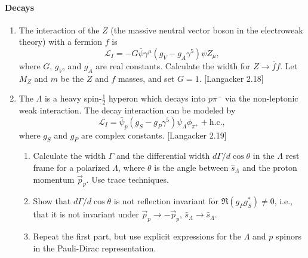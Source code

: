 \documentclass[letterpaper,11pt]{article}
\begin{document}
\paragraph*{Decays}
\begin{enumerate}
  \item The interaction of the $Z$ (the massive neutral vector boson in the electroweak theory) with a fermion $f$ is
  \begin{equation*}
    \mathcal{L}_I = -G \bar{\psi} \gamma^\mu (g_V - g_A \gamma^5) \psi Z_\mu,
  \end{equation*}
  where $G$, $g_V$, and $g_A$ are real constants. Calculate the width for $Z \to \bar{f} f$. Let $M_Z$ and $m$ be the $Z$ and $f$ masses, and set $G = 1$. [Langacker 2.18]
  \item The $\Lambda$ is a heavy spin-$\frac{1}{2}$ hyperon which decays into $p\pi^-$ via the non-leptonic weak interaction. The decay interaction can be modeled by
  \begin{equation*}
    \mathcal{L}_I = \bar{\psi}_p (g_S - g_P \gamma^5) \psi_\Lambda \phi_{\pi^+} + \mbox{h.c.},
  \end{equation*}
  where $g_S$ and $g_P$ are complex constants. [Langacker 2.19]
  \begin{enumerate}
    \item Calculate the width $\Gamma$ and the differential width $d\Gamma/d\cos\theta$ in the $\Lambda$ rest frame for a polarized $\Lambda$, where $\theta$ is the angle between $\hat{s}_\Lambda$ and the proton momentum $\vec{p}_p$. Use trace techniques.
    \item Show that $d\Gamma/d\cos\theta$ is not reflection invariant for $\Re (g_P g_S^*) \ne 0$, i.e., that it is not invariant under $\vec{p}_p \to -\vec{p}_p$, $\hat{s}_\Lambda \to \hat{s}_\Lambda$.
    \item Repeat the first part, but use explicit expressions for the $\Lambda$ and $p$ spinors in the Pauli-Dirac representation.
  \end{enumerate}
\end{enumerate}
\end{document}
